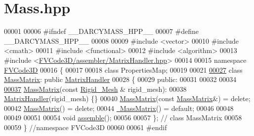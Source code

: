 \hypertarget{Mass_8hpp_source}{}\section{Mass.\+hpp}
\label{Mass_8hpp_source}

\begin{DoxyCode}
00001 
00006 \textcolor{preprocessor}{#ifndef \_\_DARCYMASS\_HPP\_\_}
00007 \textcolor{preprocessor}{#define \_\_DARCYMASS\_HPP\_\_}
00008 
00009 \textcolor{preprocessor}{#include <vector>}
00010 \textcolor{preprocessor}{#include <cmath>}
00011 \textcolor{preprocessor}{#include <functional>}
00012 \textcolor{preprocessor}{#include <algorithm>}
00013 \textcolor{preprocessor}{#include <\hyperlink{MatrixHandler_8hpp}{FVCode3D/assembler/MatrixHandler.hpp}>}
00014 
00015 \textcolor{keyword}{namespace }\hyperlink{namespaceFVCode3D}{FVCode3D}
00016 \{
00017 
00018 \textcolor{keyword}{class }PropertiesMap;
00019 
00021 
\hypertarget{Mass_8hpp_source.tex_l00027}{}\hyperlink{classFVCode3D_1_1MassMatrix}{00027} \textcolor{keyword}{class }\hyperlink{classFVCode3D_1_1MassMatrix}{MassMatrix}: \textcolor{keyword}{public} \hyperlink{classFVCode3D_1_1MatrixHandler}{MatrixHandler}
00028 \{
00029 \textcolor{keyword}{public}:
00031 
00032 
00034 
\hypertarget{Mass_8hpp_source.tex_l00037}{}\hyperlink{classFVCode3D_1_1MassMatrix_a3ecd5e64fd653d9b9af004cae2f7bdd0}{00037}     \hyperlink{classFVCode3D_1_1MassMatrix_a3ecd5e64fd653d9b9af004cae2f7bdd0}{MassMatrix}(\textcolor{keyword}{const} \hyperlink{classFVCode3D_1_1Rigid__Mesh}{Rigid\_Mesh} & rigid\_mesh):
00038         \hyperlink{classFVCode3D_1_1MatrixHandler}{MatrixHandler}(rigid\_mesh) \{\}
00040     \hyperlink{classFVCode3D_1_1MassMatrix_afc0767001d4b00b1b6fe68b844d9938a}{MassMatrix}(\textcolor{keyword}{const} \hyperlink{classFVCode3D_1_1MassMatrix}{MassMatrix}&) = \textcolor{keyword}{delete};
00042     \hyperlink{classFVCode3D_1_1MassMatrix_afc0767001d4b00b1b6fe68b844d9938a}{MassMatrix}() = \textcolor{keyword}{delete};
00044     \hyperlink{classFVCode3D_1_1MassMatrix_a689a8957bdc84140477082bc48762011}{~MassMatrix}() = \textcolor{keywordflow}{default};
00046 
00048 
00049 
00051 
00054     \textcolor{keywordtype}{void} \hyperlink{classFVCode3D_1_1MassMatrix_ac5f8226ecd4e8d193bfe1bd87c0918e4}{assemble}();
00056 
00057 \}; \textcolor{comment}{// class MassMatrix}
00058 
00059 \} \textcolor{comment}{//namespace FVCode3D}
00060 
00061 \textcolor{preprocessor}{#endif}
\end{DoxyCode}
